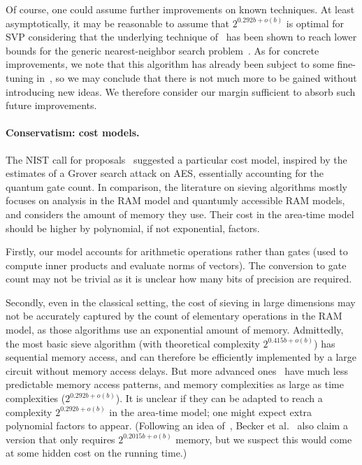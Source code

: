 Of course, one could assume further improvements on known techniques.
At least asymptotically, it may be reasonable to assume that
$2^{0.292 b + o(b)}$ is optimal for SVP considering that the
underlying technique of~\cite{SODA:BDGL16} has been shown to reach
lower bounds for the generic nearest-neighbor search
problem~\cite{SODA:ALRW17}.  As for concrete improvements, we note
that this algorithm has already been subject to some fine-tuning
in~\cite{mariano2017parallel}, so we may conclude that there is not
much more to be gained without introducing new ideas. We therefore
consider our margin sufficient to absorb such future improvements.

\paragraph{Conservatism: cost models.}

The NIST call for proposals~\cite{NIST17} suggested a particular cost model,
inspired by the estimates of a Grover search attack on AES,
essentially accounting for the quantum gate count. In comparison, the
literature on sieving algorithms mostly focuses on analysis in the RAM
model and quantumly accessible RAM models, and considers the amount of
memory they use. Their cost in the area-time model should be higher by
polynomial, if not exponential, factors.

Firstly, our model accounts for arithmetic operations rather than
gates (used to compute inner products and evaluate norms of
vectors). The conversion to gate count may not be trivial as it is
unclear how many bits of precision are required.

Secondly, even in the classical setting, the cost of sieving in large
dimensions may not be accurately captured by the count of elementary
operations in the RAM model, as those algorithms use an exponential
amount of memory. Admittedly, the most basic sieve algorithm (with
theoretical complexity $2^{0.415b + o(b)}$) has sequential memory
access, and can therefore be efficiently implemented by a large
circuit without memory access delays. But more advanced
ones~\cite{SODA:BDGL16} have much less predictable memory access
patterns, and memory complexities as large as time complexities
($2^{0.292 b + o(b)}$). It is unclear if they can be adapted to reach
a complexity $2^{0.292 b + o(b)}$ in the area-time model; one might
expect extra polynomial factors to appear. (Following an idea
of~\cite{EPRINT:BecGamJou15}, Becker et al.~\cite{SODA:BDGL16} also
claim a version that only requires $2^{0.2015b + o(b)}$ memory, but
we suspect this would come at some hidden cost on the running time.)

